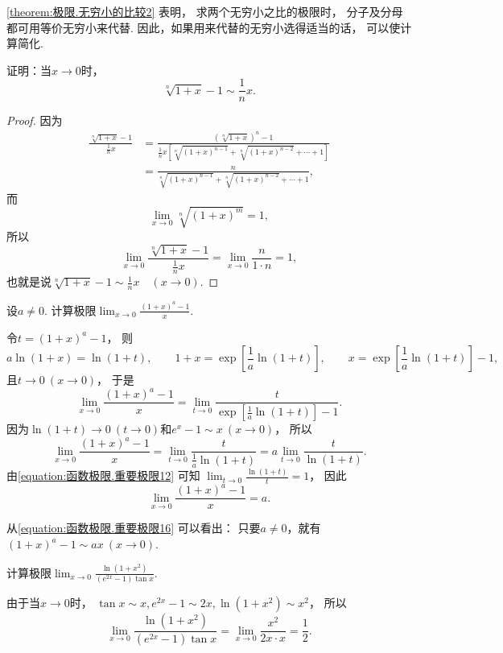 \cref{theorem:极限.无穷小的比较2} 表明，
求两个无穷小之比的极限时，
分子及分母都可用等价无穷小来代替.
因此，如果用来代替的无穷小选得适当的话，
可以使计算简化.

\begin{example}
证明：当\(x\to0\)时，\begin{equation}
	\sqrt[n]{1+x} - 1 \sim \frac1n x.
\end{equation}
\begin{proof}
因为\begin{align*}
	\frac{\sqrt[n]{1+x} - 1}{\frac1n x}
	&= \frac{(\sqrt[n]{1+x})^n - 1}{\frac1n x \left[ \sqrt[n]{(1+x)^{n-1}} + \sqrt[n]{(1+x)^{n-2}} + \dotsb + 1 \right]} \\
	&= \frac{n}{\sqrt[n]{(1+x)^{n-1}} + \sqrt[n]{(1+x)^{n-2}} + \dotsb + 1},
\end{align*}
而\[
	\lim_{x\to0} \sqrt[n]{(1+x)^m} = 1,
\]
所以\[
	\lim_{x\to0} \frac{\sqrt[n]{1+x} - 1}{\frac1n x} = \lim_{x\to0} \frac{n}{1 \cdot n} = 1,
\]
也就是说\(\sqrt[n]{1+x} - 1 \sim \frac1n x \quad(x\to0)\).
\end{proof}
\end{example}

\begin{example}
设\(a\neq0\).
计算极限\(\lim_{x\to0} \frac{(1+x)^a-1}x\).
\begin{solution}
令\(t = (1+x)^a-1\)，
则\[
	a \ln(1+x) = \ln(1+t),
	\qquad
	1+x=\exp[\frac1a \ln(1+t)],
	\qquad
	x=\exp[\frac1a \ln(1+t)]-1,
\]
且\(t\to0\ (x\to0)\)，
于是\[
	\lim_{x\to0} \frac{(1+x)^a-1}x
	= \lim_{t\to0} \frac{t}{\exp[\frac1a \ln(1+t)]-1}.
\]
因为\(\ln(1+t)\to0\ (t\to0)\)和\(e^x-1 \sim x\ (x\to0)\)，
所以\[
	\lim_{x\to0} \frac{(1+x)^a-1}x
	= \lim_{t\to0} \frac{t}{\frac1a \ln(1+t)}
	= a \lim_{t\to0} \frac{t}{\ln(1+t)}.
\]
由\cref{equation:函数极限.重要极限12} 可知
\(\lim_{t\to0} \frac{\ln(1+t)}{t} = 1\)，
因此\begin{equation}\label{equation:函数极限.重要极限16}
	\lim_{x\to0} \frac{(1+x)^a-1}x
	= a.
\end{equation}
\end{solution}
\end{example}
\begin{remark}
从\cref{equation:函数极限.重要极限16} 可以看出：
只要\(a\neq0\)，就有\((1+x)^a-1 \sim ax\ (x\to0)\).
\end{remark}

\begin{example}
计算极限\(\lim_{x\to0} \frac{\ln(1+x^2)}{(e^{2x}-1) \tan x}\).
\begin{solution}
由于当\(x\to0\)时，
\(\tan x \sim x,
e^{2x}-1 \sim 2x,
\ln(1+x^2) \sim x^2\)，
所以\[
	\lim_{x\to0} \frac{\ln(1+x^2)}{(e^{2x}-1) \tan x}
	= \lim_{x\to0} \frac{x^2}{2x \cdot x}
	= \frac12.
\]
\end{solution}
\end{example}

